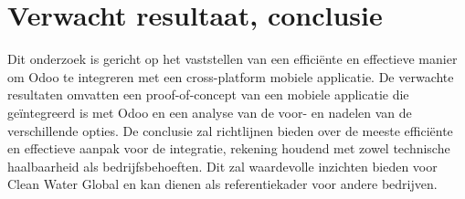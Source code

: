\section{Verwacht resultaat, conclusie}%
\label{sec:verwachte_resultaten}

Dit onderzoek is gericht op het vaststellen van een efficiënte en effectieve manier om Odoo te integreren met een cross-platform mobiele applicatie. 
De verwachte resultaten omvatten een proof-of-concept van een mobiele applicatie die geïntegreerd is met Odoo en een analyse van de voor- en nadelen van de verschillende opties.
De conclusie zal richtlijnen bieden over de meeste efficiënte en effectieve aanpak voor de integratie, rekening houdend met zowel technische haalbaarheid als bedrijfsbehoeften.
Dit zal waardevolle inzichten bieden voor Clean Water Global en kan dienen als referentiekader voor andere bedrijven.
